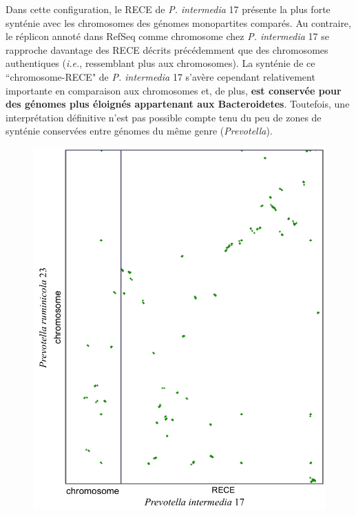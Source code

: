 	Dans cette configuration, le RECE de \textit{P. intermedia} 17 présente la plus forte synténie avec les chromosomes des génomes monopartites comparés. Au contraire, le réplicon annoté dans RefSeq comme chromosome chez \textit{P. intermedia} 17 se rapproche davantage des RECE décrits précédemment que des chromosomes authentiques (\textit{i.e.}, ressemblant plus aux chromosomes). La  synténie de ce ``chromosome-RECE" de \textit{P. intermedia} 17 s'avère cependant relativement importante en comparaison aux chromosomes et, de plus, \textbf{est conservée pour des génomes plus éloignés appartenant aux Bacteroidetes}. Toutefois, une interprétation définitive n'est pas possible compte tenu du peu de zones de synténie conservées entre génomes du même genre (\textit{Prevotella}). 
     
\begin{figure}[H]
   \begin{center}
   \vspace{-0.5cm}
   \hspace{-2cm}
   \begin{minipage}{0.5\textwidth}
   \includegraphics[width=1.1\textwidth]{./img/synteny/new/fig8_15a.png}

\end{minipage}
\end{center}
\end{figure}
